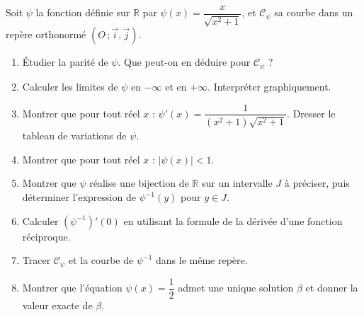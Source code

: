 \documentclass[11pt]{article}
\begin{document}
\begin{exercice}
Soit $\psi$ la fonction définie sur $\mathbb{R}$ par $\psi(x)=\dfrac{x}{\sqrt{x^2+1}}$, et $\mathcal{C}_\psi$ sa courbe dans un repère orthonormé $(O\,;\vec{i},\vec{j})$.
\begin{enumerate}
\item Étudier la parité de $\psi$. Que peut-on en déduire pour $\mathcal{C}_\psi$ ?
\item Calculer les limites de $\psi$ en $-\infty$ et en $+\infty$. Interpréter graphiquement.
\item Montrer que pour tout réel $x$ : $\psi'(x)=\dfrac{1}{(x^2+1)\sqrt{x^2+1}}$. Dresser le tableau de variations de $\psi$.
\item Montrer que pour tout réel $x$ : $|\psi(x)|<1$.
\item Montrer que $\psi$ réalise une bijection de $\mathbb{R}$ sur un intervalle $J$ à préciser, puis déterminer l'expression de $\psi^{-1}(y)$ pour $y\in J$.
\item Calculer $(\psi^{-1})'(0)$ en utilisant la formule de la dérivée d'une fonction réciproque.
\item Tracer $\mathcal{C}_\psi$ et la courbe de $\psi^{-1}$ dans le même repère.
\item Montrer que l'équation $\psi(x)=\dfrac{1}{2}$ admet une unique solution $\beta$ et donner la valeur exacte de $\beta$.
\end{enumerate}
\end{exercice}
\end{document}
